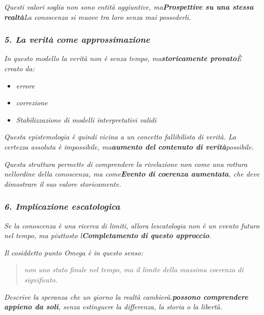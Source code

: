 \documentclass[
]{article}
\begin{document}
\emph{Questi valori soglia non sono entità aggiuntive, ma\textbf{Prospettive su una stessa realtà}La conoscenza si muove tra loro senza mai possederli.}

\subsubsection{\texorpdfstring{\emph{\textbf{5. La verità come approssimazione}}}{5. La verità come approssimazione}}\label{la-verituxe0-come-approssimazione}

\emph{In questo modello la verità non è senza tempo, ma\textbf{storicamente provato}È creato da:}

\begin{itemize}
\item
  \emph{errore}
\item
  \emph{correzione}
\item
  \emph{Stabilizzazione di modelli interpretativi validi}
\end{itemize}

\emph{Questa epistemologia è quindi vicina a un concetto fallibilista di verità. La certezza assoluta è impossibile, ma\textbf{aumento del contenuto di verità}possibile.}

\emph{Questa struttura permette di comprendere la rivelazione non come una rottura nell\textquotesingle ordine della conoscenza, ma come\textbf{Evento di coerenza aumentata}, che deve dimostrare il suo valore storicamente.}

\subsubsection{\texorpdfstring{\emph{\textbf{6. Implicazione escatologica}}}{6. Implicazione escatologica}}\label{implicazione-escatologica}

\emph{Se la conoscenza è una ricerca di limiti, allora l\textquotesingle escatologia non è un evento futuro nel tempo, ma piuttosto l\textquotesingle{}\textbf{Completamento di questo approccio}.}

\emph{Il cosiddetto punto Omega è in questo senso:}

\begin{quote}
\emph{non uno stato finale nel tempo, ma il limite della massima coerenza di significato.}
\end{quote}

\emph{Descrive la speranza che un giorno la realtà cambierà.\textbf{possono comprendere appieno da soli}, senza estinguere la differenza, la storia o la libertà.}
\end{document}
